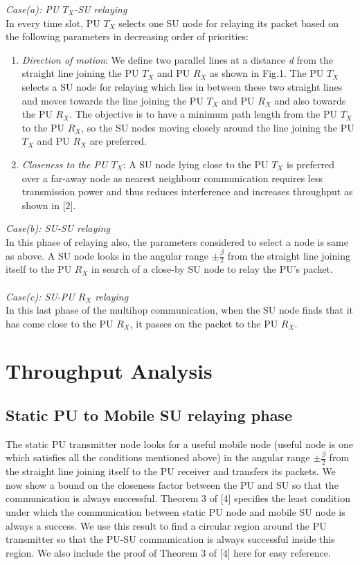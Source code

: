 \documentclass[conference]{IEEEtran}
\begin{document}
\emph{Case(a): PU $T_X$-SU relaying}\\
In every time slot, PU $T_X$ selects one SU node for relaying its packet based on the following parameters in decreasing order of priorities:
\begin{enumerate}
 \item \textit{Direction of motion}: We define two parallel lines at a distance \emph{d} from the straight line joining the PU $T_X$ and PU $R_X$ as shown in Fig.1. The PU $T_X$ 
selects a SU node for relaying which lies in between these two 
straight lines and moves towards the line joining the PU $T_X$ and PU $R_X$ and also towards the PU $R_X$. The objective is to have a minimum path length from the PU $T_X$ 
to the PU $R_X$, so the SU nodes moving closely around the line joining the PU $T_X$ and PU $R_X$ are preferred.

\item \textit{Closeness to the PU $T_X$}: A SU node lying close to the PU $T_X$ is preferred over a far-away node as nearest neighbour communication requires less transmission power and thus
reduces interference and increases throughput as shown in [2].

\end{enumerate}

\emph{Case(b): SU-SU relaying}\\ In this phase of relaying also, the parameters considered to select a node is same as above. A SU node looks in the angular range $\pm \frac{\beta}{2}$ 
from the straight line joining itself to the PU $R_X$ in search of a close-by SU node to relay the PU's packet.\\ \\
\emph{Case(c): SU-PU $R_X$ relaying}\\ In this last phase of the multihop communication, when the SU node finds that it has come close to the PU $R_X$, it passes on the packet to the PU $R_X$.

\section{Throughput Analysis}
\subsection{Static PU to Mobile SU relaying phase}
The static PU transmitter node looks for a useful mobile node (useful node is one which satisfies all the conditions mentioned above) in the angular range $\pm \frac{\beta}{2}$ from the 
straight line joining itself to the PU receiver and transfers its packets. We now show a bound on the closeness factor between the PU and SU so that the communication is always successful. 
Theorem 3 of [4] specifies the least condition under which the communication between static PU node and mobile SU node is always a success. We use this result to find a circular 
region around the PU transmitter so that the PU-SU communication is always successful inside this region. We also include the proof of Theorem 3 of [4] here for easy reference.\\
\end{document}
